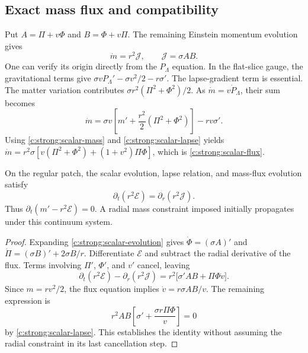 \subsection{Exact mass flux and compatibility}
Put $A=\Pi+v\Phi$ and $B=\Phi+v\Pi$. The remaining Einstein momentum evolution gives
\begin{equation}
 \dot m=r^2\mathcal J,\qquad \mathcal J=\sigma AB.
\label{c:strong:scalar-flux}
\end{equation}
One can verify its origin directly from the $P_\Lambda$ equation. In the flat-slice gauge, the gravitational terms give $\sigma vP_\Lambda'-\sigma v^2/2-r\sigma'$. The lapse-gradient term is essential. The matter variation contributes $\sigma r^2(\Pi^2+\Phi^2)/2$. As $\dot m=v\dot P_\Lambda$, their sum becomes
\begin{equation}
 \dot m=\sigma v\left[m'+\frac{r^2}{2}(\Pi^2+\Phi^2)\right]-rv\sigma'.
\end{equation}
Using \eqref{c:strong:scalar-mass} and \eqref{c:strong:scalar-lapse} yields
$\dot m=r^2\sigma[v(\Pi^2+\Phi^2)+(1+v^2)\Pi\Phi]$, which is \eqref{c:strong:scalar-flux}.

\begin{proposition}
On the regular patch, the scalar evolution, lapse relation, and mass-flux evolution satisfy
\begin{equation}
 \partial_t(r^2\mathcal E)=\partial_r(r^2\mathcal J).
\label{c:strong:scalar-compatibility}
\end{equation}
Thus $\partial_t(m'-r^2\mathcal E)=0$. A radial mass constraint imposed initially propagates under this continuum system.
\end{proposition}
\begin{proof}
Expanding \eqref{c:strong:scalar-evolution} gives
$\dot\Phi=(\sigma A)'$ and $\dot\Pi=(\sigma B)'+2\sigma B/r$.
Differentiate $\mathcal E$ and subtract the radial derivative of the flux. Terms involving $\Pi'$, $\Phi'$, and $v'$ cancel, leaving
\begin{equation}
 \partial_t(r^2\mathcal E)-\partial_r(r^2\mathcal J)
 =r^2\bigl[\sigma'AB+\Pi\Phi\dot v\bigr].
\end{equation}
Since $m=rv^2/2$, the flux equation implies $\dot v=r\sigma AB/v$. The remaining expression is
\begin{equation}
 r^2AB\left[\sigma'+\frac{\sigma r\Pi\Phi}{v}\right]=0
\end{equation}
by \eqref{c:strong:scalar-lapse}. This establishes the identity without assuming the radial constraint in its last cancellation step.
\end{proof}

